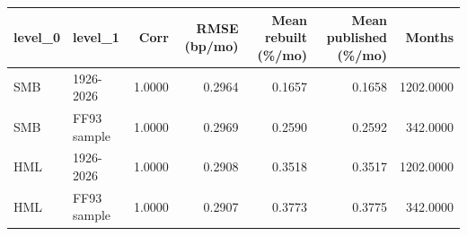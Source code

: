 \begin{tabular}{llrrrrr}
\toprule
level\_0 & level\_1 & Corr & RMSE (bp/mo) & Mean rebuilt (\%/mo) & Mean published (\%/mo) & Months \\
\midrule
SMB & 1926-2026 & 1.0000 & 0.2964 & 0.1657 & 0.1658 & 1202.0000 \\
SMB & FF93 sample & 1.0000 & 0.2969 & 0.2590 & 0.2592 & 342.0000 \\
HML & 1926-2026 & 1.0000 & 0.2908 & 0.3518 & 0.3517 & 1202.0000 \\
HML & FF93 sample & 1.0000 & 0.2907 & 0.3773 & 0.3775 & 342.0000 \\
\bottomrule
\end{tabular}
